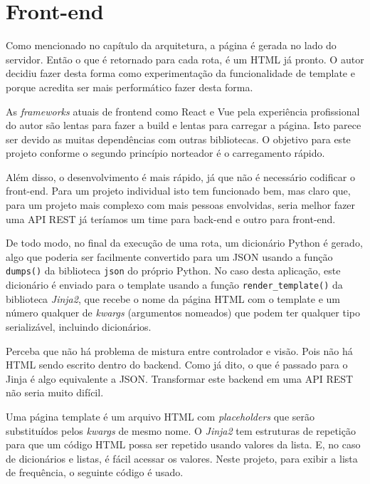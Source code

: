 \chapter{Front-end}

Como mencionado no capítulo da arquitetura, a página é gerada no lado do servidor. Então o que 
é retornado para cada rota, é um HTML já pronto. O autor decidiu fazer desta forma
como experimentação da funcionalidade de template e porque acredita ser mais 
performático fazer desta forma.

As \textit{frameworks} atuais de frontend como React e Vue pela experiência profissional do autor
são lentas para fazer a build e lentas para carregar a página. Isto parece ser devido
as muitas dependências com outras bibliotecas.
 O objetivo para este projeto conforme o segundo princípio norteador é o carregamento rápido.

Além disso, o desenvolvimento é mais rápido, já que não é necessário codificar o front-end.
Para um projeto individual isto tem funcionado bem, mas claro que, para um projeto mais
complexo com
mais pessoas envolvidas, seria melhor fazer uma API REST já teríamos um time para back-end e outro
para front-end.

De todo modo, no final da execução de uma rota, um dicionário Python é gerado, algo que 
poderia ser facilmente convertido para um JSON usando a função \texttt{dumps()} da 
biblioteca \texttt{json} do próprio Python. No caso desta aplicação, este dicionário é 
enviado para o template usando a função \texttt{render\_template()} da biblioteca \textit{Jinja2}, 
que recebe o nome da página HTML com o template e um número qualquer de \textit{kwargs} (argumentos nomeados) 
que podem ter qualquer tipo serializável, incluindo dicionários.

Perceba que não há problema de mistura entre controlador e visão. Pois não há HTML sendo 
escrito dentro do backend. Como já dito, o que é passado para o Jinja é algo equivalente a JSON.
Transformar este backend em uma API REST não seria muito difícil.

Uma página template é um arquivo HTML com \textit{placeholders} que serão substituídos pelos 
\textit{kwargs} de mesmo nome. O \textit{Jinja2} tem estruturas de repetição para que um código HTML 
possa ser repetido usando valores da lista. E, no caso de dicionários e listas, é fácil acessar 
os valores. Neste projeto, para exibir a lista de frequência, o seguinte código é usado.




